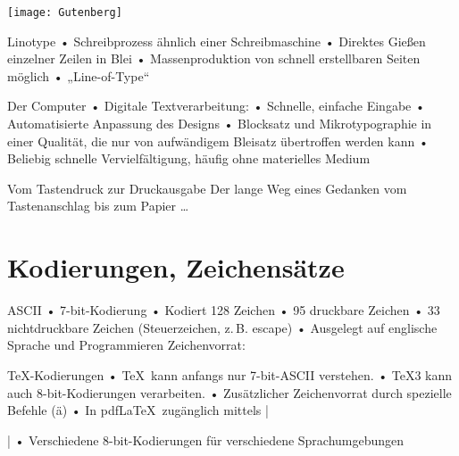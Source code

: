 {
\begin{frame}[plain]
\vspace*{-.5em}
\centerline{\texttt{[image: Gutenberg]}}
\end{frame}}

\begin{frame}{Linotype}
• Schreibprozess ähnlich einer Schreibmaschine
• Direktes Gießen einzelner Zeilen in Blei
• Massenproduktion von schnell erstellbaren Seiten möglich
• „Line-of-Type“
\• 
\einschub[LinoType]
\end{frame}

\begin{frame}{Der Computer}
• Digitale Textverarbeitung:
• Schnelle, einfache Eingabe
• Automatisierte Anpassung des Designs
• Blocksatz und Mikrotypographie in einer Qualität, die nur von aufwändigem Bleisatz übertroffen werden kann
• Beliebig schnelle Vervielfältigung, häufig ohne materielles Medium
\•
\end{frame}

\begin{frame}{Vom Tastendruck zur Druckausgabe}
Der lange Weg eines Gedanken vom Tastenanschlag bis zum Papier …
\end{frame}

\section{Kodierungen, Zeichensätze}
\begin{frame}[fragile]{ASCII}
• 7-bit-Kodierung
• Kodiert 128 Zeichen
• 95 druckbare Zeichen
• 33 nichtdruckbare Zeichen (Steuerzeichen, z.\,B. escape)
• Ausgelegt auf englische Sprache und Programmieren
\• 
Zeichenvorrat:
\begin{verbatim*}
 !"#$%&'()*+,-./0123456789:;<=>?
@ABCDEFGHIJKLMNOPQRSTUVWXYZ[\]^_
`abcdefghijklmnopqrstuvwxyz{|}~ 
\end{verbatim*}
\end{frame}

\begin{frame}[fragile]{\TeX-Kodierungen}
• \TeX\ kann anfangs nur 7-bit-ASCII verstehen.
• \TeX3 kann auch 8-bit-Kodierungen verarbeiten.
• Zusätzlicher Zeichenvorrat durch spezielle Befehle (\"a)
• In pdf\LaTeX\ zugänglich mittels |\usepackage[kodierung]{inputenc}|
• Verschiedene 8-bit-Kodierungen für verschiedene Sprachumgebungen
\•
\end{frame}

